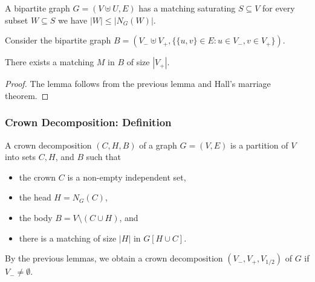 \begin{frame}

 \begin{theorem}
  A bipartite graph $G=(V \uplus U,E)$ has a matching saturating $S\subseteq V$ \slides{\begin{align*}\Leftrightarrow\end{align*}} for every subset $W\subseteq S$ we have $|W| \le |N_G(W)|$. 
 \end{theorem}
 
 \pause
 \medskip
 \noindent
 Consider the bipartite %
 graph $B=(V_-\uplus V_+, \{\{u,v\} \in E : u\in V_-, v\in V_+\})$.
 
 \begin{lemma}
  There exists a matching $M$ in $B$ of size $|V_+|$.
 \end{lemma}
 \begin{proof}
  The lemma follows from the previous lemma and Hall's marriage theorem.
 \end{proof}

\end{frame}

\begin{frame}
 \frametitle{Crown Decomposition: Definition}

 \begin{definition}
  A crown decomposition $(C,H,B)$ of a graph $G=(V,E)$ is a partition of $V$ into sets $C,H$, and $B$ such that
  \begin{itemize}
   \item the crown $C$ is a non-empty independent set,
   \item the head $H=N_G(C)$,
   \item the body $B = V \setminus (C\cup H)$, and
   \item there is a matching of size $|H|$ in $G[H \cup C]$.
  \end{itemize}
 \end{definition}
 
 \noindent
 By the previous lemmas, we obtain a crown decomposition $(V_-,V_+,V_{1/2})$ of $G$ if $V_- \ne \emptyset$.
\end{frame}


